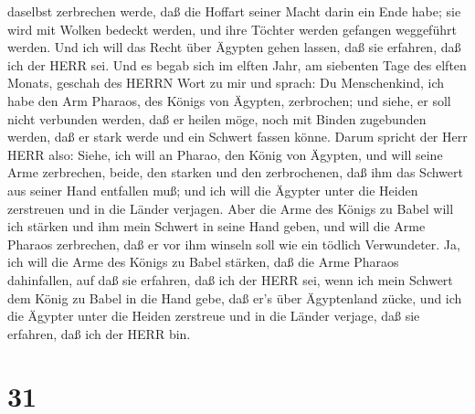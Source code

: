 daselbst zerbrechen werde, daß die Hoffart seiner Macht darin ein Ende
habe; sie wird mit Wolken bedeckt werden, und ihre Töchter werden
gefangen weggeführt werden.  Und ich will das Recht über
Ägypten gehen lassen, daß sie erfahren, daß ich der HERR sei.
 Und es begab sich im elften Jahr, am siebenten Tage des
elften Monats, geschah des HERRN Wort zu mir und sprach: 
Du Menschenkind, ich habe den Arm Pharaos, des Königs von Ägypten,
zerbrochen; und siehe, er soll nicht verbunden werden, daß er heilen
möge, noch mit Binden zugebunden werden, daß er stark werde und ein
Schwert fassen könne.  Darum spricht der Herr HERR also:
Siehe, ich will an Pharao, den König von Ägypten, und will seine Arme
zerbrechen, beide, den starken und den zerbrochenen, daß ihm das Schwert
aus seiner Hand entfallen muß;  und ich will die Ägypter
unter die Heiden zerstreuen und in die Länder verjagen. 
Aber die Arme des Königs zu Babel will ich stärken und ihm mein Schwert
in seine Hand geben, und will die Arme Pharaos zerbrechen, daß er vor
ihm winseln soll wie ein tödlich Verwundeter.  Ja, ich will
die Arme des Königs zu Babel stärken, daß die Arme Pharaos dahinfallen,
auf daß sie erfahren, daß ich der HERR sei, wenn ich mein Schwert dem
König zu Babel in die Hand gebe, daß er's über Ägyptenland zücke,
 und ich die Ägypter unter die Heiden zerstreue und in die
Länder verjage, daß sie erfahren, daß ich der HERR bin.

\hypertarget{section-30}{%
\section{31}\label{section-30}}

